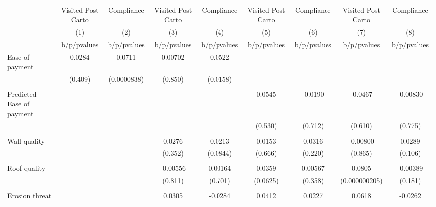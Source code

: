 {
\def\sym#1{\ifmmode^{#1}\else\(^{#1}\)\fi}
\begin{tabular}{l*{8}{c}}
\toprule
                &\multicolumn{1}{c}{Visited Post Carto}&\multicolumn{1}{c}{Compliance}&\multicolumn{1}{c}{Visited Post Carto}&\multicolumn{1}{c}{Compliance}&\multicolumn{1}{c}{Visited Post Carto}&\multicolumn{1}{c}{Compliance}&\multicolumn{1}{c}{Visited Post Carto}&\multicolumn{1}{c}{Compliance}\\
                &\multicolumn{1}{c}{(1)}&\multicolumn{1}{c}{(2)}&\multicolumn{1}{c}{(3)}&\multicolumn{1}{c}{(4)}&\multicolumn{1}{c}{(5)}&\multicolumn{1}{c}{(6)}&\multicolumn{1}{c}{(7)}&\multicolumn{1}{c}{(8)}\\
                &b/p/pvalues&b/p/pvalues&b/p/pvalues&b/p/pvalues&b/p/pvalues&b/p/pvalues&b/p/pvalues&b/p/pvalues\\
\midrule
Ease of payment &   0.0284&   0.0711&  0.00702&   0.0522&         &         &         &         \\
                &  (0.409)&(0.0000838)&  (0.850)& (0.0158)&         &         &         &         \\
                &         &         &         &         &         &         &         &         \\
Predicted Ease of payment&         &         &         &         &   0.0545&  -0.0190&  -0.0467& -0.00830\\
                &         &         &         &         &  (0.530)&  (0.712)&  (0.610)&  (0.775)\\
                &         &         &         &         &         &         &         &         \\
Wall quality    &         &         &   0.0276&   0.0213&   0.0153&   0.0316& -0.00800&   0.0289\\
                &         &         &  (0.352)& (0.0844)&  (0.666)&  (0.220)&  (0.865)&  (0.106)\\
                &         &         &         &         &         &         &         &         \\
Roof quality    &         &         & -0.00556&  0.00164&   0.0359&  0.00567&   0.0805& -0.00389\\
                &         &         &  (0.811)&  (0.701)& (0.0625)&  (0.358)&(0.000000205)&  (0.181)\\
                &         &         &         &         &         &         &         &         \\
Erosion threat  &         &         &   0.0305&  -0.0284&   0.0412&   0.0227&   0.0618&  -0.0262\\

\end{tabular}}

